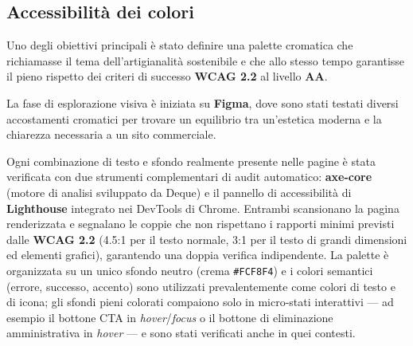 \documentclass[11pt,a4paper]{article}
\begin{document}
\subsection{Accessibilit\`a dei colori}
Uno degli obiettivi principali \`e stato definire una palette cromatica che richiamasse il tema dell'artigianalit\`a sostenibile e che allo stesso tempo garantisse il pieno rispetto dei criteri di successo \textbf{WCAG 2.2} al livello \textbf{AA}.

La fase di esplorazione visiva \`e iniziata su \textbf{Figma}, dove sono stati testati diversi accostamenti cromatici per trovare un equilibrio tra un'estetica moderna e la chiarezza necessaria a un sito commerciale.

Ogni combinazione di testo e sfondo realmente presente nelle pagine \`e stata verificata con due strumenti complementari di audit automatico: \textbf{axe-core} (motore di analisi sviluppato da Deque) e il pannello di accessibilit\`a di \textbf{Lighthouse} integrato nei DevTools di Chrome. Entrambi scansionano la pagina renderizzata e segnalano le coppie che non rispettano i rapporti minimi previsti dalle \textbf{WCAG 2.2} (4.5:1 per il testo normale, 3:1 per il testo di grandi dimensioni ed elementi grafici), garantendo una doppia verifica indipendente. La palette \`e organizzata su un unico sfondo neutro (crema \texttt{\#FCF8F4}) e i colori semantici (errore, successo, accento) sono utilizzati prevalentemente come colori di testo e di icona; gli sfondi pieni colorati compaiono solo in micro-stati interattivi --- ad esempio il bottone CTA in \textit{hover}/\textit{focus} o il bottone di eliminazione amministrativa in \textit{hover} --- e sono stati verificati anche in quei contesti.
\end{document}
